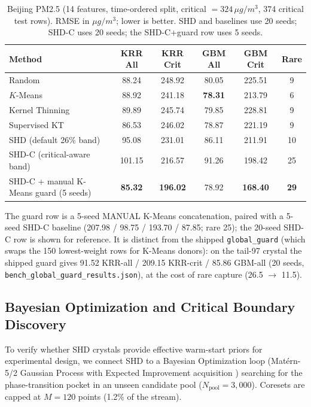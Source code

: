 \documentclass[11pt,a4paper]{article}
\begin{document}
\begin{table}[t]
\centering
\small
\caption{Beijing PM2.5 (14 features, time-ordered split, critical $=324\,\mu g/m^3$, 374 critical test rows). RMSE in $\mu g/m^3$; lower is better. SHD and baselines use 20 seeds; SHD-C uses 20 seeds; the SHD-C+guard row uses 5 seeds.}
\label{tab:pm25}
\begin{tabular}{lccccc}
\toprule
\textbf{Method} & \textbf{KRR All} & \textbf{KRR Crit} & \textbf{GBM All} & \textbf{GBM Crit} & \textbf{Rare} \\
\midrule
Random & 88.24 & 248.92 & 80.05 & 225.51 & 9 \\
$K$-Means & 88.92 & 241.18 & \textbf{78.31} & 213.79 & 6 \\
Kernel Thinning & 89.89 & 245.74 & 79.85 & 228.81 & 9 \\
Supervised KT & 86.53 & 246.02 & 78.87 & 221.19 & 9 \\
SHD (default 26\% band) & 95.08 & 231.01 & 86.11 & 211.91 & 10 \\
SHD-C (critical-aware band) & 101.15 & 216.57 & 91.26 & 198.42 & 25 \\
SHD-C + manual K-Means guard (5 seeds) & \textbf{85.32} & \textbf{196.02} & 78.92 & \textbf{168.40} & \textbf{29} \\
\bottomrule
\end{tabular}
\vspace{2pt}\footnotesize{The guard row is a 5-seed MANUAL K-Means concatenation, paired with a 5-seed SHD-C baseline (207.98 / 98.75 / 193.70 / 87.85; rare 25); the 20-seed SHD-C row is shown for reference. It is distinct from the shipped \texttt{global\_guard} (which swaps the 150 lowest-weight rows for K-Means donors): on the tail-97 crystal the shipped guard gives 91.52 KRR-all / 209.15 KRR-crit / 85.86 GBM-all (20 seeds, \texttt{bench\_global\_guard\_results.json}), at the cost of rare capture (26.5 $\to$ 11.5).}
\end{table}

\subsection{Bayesian Optimization and Critical Boundary Discovery}

To verify whether SHD crystals provide effective warm-start priors for experimental design, we connect SHD to a Bayesian Optimization loop (Mat\'ern-5/2 Gaussian Process \citep{rasmussen2006gaussian} with Expected Improvement acquisition \citep{jones1998efficient}) searching for the phase-transition pocket in an unseen candidate pool ($N_{\text{pool}} = 3,000$). Coresets are capped at $M = 120$ points (1.2\% of the stream).
\end{document}

